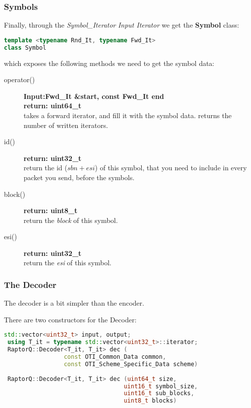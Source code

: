 \documentclass[11pt,a4paper]{refart}
\begin{document}
\subsubsection{Symbols}
Finally, through the \textit{Symbol\_Iterator} \textit{Input Iterator} we get the \textbf{Symbol} class:
\begin{lstlisting}[language=C++]
template <typename Rnd_It, typename Fwd_It>
class Symbol
\end{lstlisting}

which exposes the following methods we need to get the symbol data:

\begin{description}
\item[operator()]\textbf{Input:Fwd\_It \&start, const Fwd\_It end}\\
\textbf{return: uint64\_t}\\
takes a forward iterator, and fill it with the symbol data. returns the number of written iterators.
\item[id()]\textbf{return: uint32\_t}\\
return the id (\textit{$sbn + esi$}) of this symbol, that you need to include in every packet you send, before the symbols.
\item[block()]\textbf{return: uint8\_t}\\
return the \textit{block} of this symbol.
\item[esi()]\textbf{return: uint32\_t}\\
return the \textit{esi} of this symbol.
\end{description}
\newpage
\subsubsection{The Decoder}

The decoder is a bit simpler than the encoder.

There are two constructors for the Decoder:

\begin{lstlisting}[language=C++]
 std::vector<uint32_t> input, output;
 using T_it = typename std::vector<uint32_t>::iterator;
 RaptorQ::Decoder<T_it, T_it> dec (
                 const OTI_Common_Data common,
                 const OTI_Scheme_Specific_Data scheme)
                              
 RaptorQ::Decoder<T_it, T_it> dec (uint64_t size,
                                  uint16_t symbol_size,
                                  uint16_t sub_blocks,
                                  uint8_t blocks)
\end{lstlisting}
\end{document}
